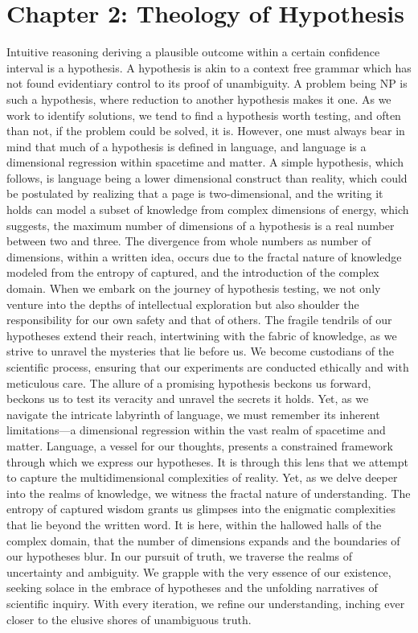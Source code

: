 \documentclass[ebook,12pt,oneside,openany]{memoir}
\begin{document}
\chapter*{Chapter 2: Theology of Hypothesis}
Intuitive reasoning deriving a plausible outcome within a certain confidence interval is a hypothesis. A hypothesis is akin to a context free grammar which has not found evidentiary control to its proof of unambiguity. A problem being NP is such a hypothesis, where reduction to another hypothesis makes it one.
	As we work to identify solutions, we tend to find a hypothesis worth testing, and often than not, if the problem could be solved, it is. However, one must always bear in mind that much of a hypothesis is defined in language, and language is a dimensional regression within spacetime and matter.
	A simple hypothesis, which follows, is language being a lower dimensional construct than reality, which could be postulated by realizing that a page is two-dimensional, and the writing it holds can model a subset of knowledge from complex dimensions of energy,  which suggests, the maximum number of dimensions of a hypothesis is a real number between two and three. The divergence from whole numbers as number of dimensions, within a written idea, occurs due to the fractal nature of knowledge modeled from the entropy of captured, and the introduction of the complex domain.
When we embark on the journey of hypothesis testing, we not only venture into the depths of intellectual exploration but also shoulder the responsibility for our own safety and that of others. The fragile tendrils of our hypotheses extend their reach, intertwining with the fabric of knowledge, as we strive to unravel the mysteries that lie before us. We become custodians of the scientific process, ensuring that our experiments are conducted ethically and with meticulous care.
The allure of a promising hypothesis beckons us forward, beckons us to test its veracity and unravel the secrets it holds. Yet, as we navigate the intricate labyrinth of language, we must remember its inherent limitations—a dimensional regression within the vast realm of spacetime and matter. Language, a vessel for our thoughts, presents a constrained framework through which we express our hypotheses. It is through this lens that we attempt to capture the multidimensional complexities of reality.
Yet, as we delve deeper into the realms of knowledge, we witness the fractal nature of understanding. The entropy of captured wisdom grants us glimpses into the enigmatic complexities that lie beyond the written word. It is here, within the hallowed halls of the complex domain, that the number of dimensions expands and the boundaries of our hypotheses blur.
In our pursuit of truth, we traverse the realms of uncertainty and ambiguity. We grapple with the very essence of our existence, seeking solace in the embrace of hypotheses and the unfolding narratives of scientific inquiry. With every iteration, we refine our understanding, inching ever closer to the elusive shores of unambiguous truth.
\end{document}

